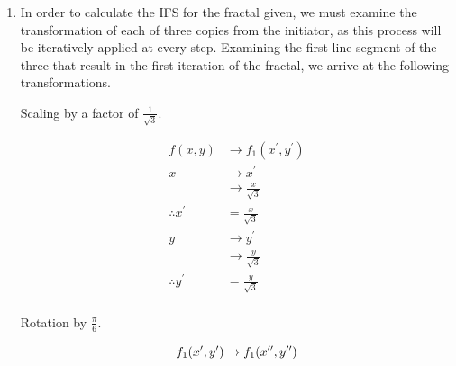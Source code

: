 \documentclass[a4paper]{article}
\begin{document}
\begin{enumerate}[label=\textbf{\arabic*.}]
\begin{enumerate}
		\item In order to calculate the IFS for the fractal given, we must examine the transformation of each of three copies from the initiator, as this process will be iteratively applied at every step. Examining the first line segment of the three that result in the first iteration of the fractal, we arrive at the following transformations.

		\bigbreak

		\begin{center}
		Scaling by a factor of $\frac{1}{\sqrt{3}}$.
		\end{center}

		\begin{align*}
		f(x,y) & \rightarrow f_1(x^{\prime},y^{\prime})\\
		x & \rightarrow x^{\prime}\\
		& \rightarrow \frac{x}{\sqrt{3}}\\
		\therefore x^{\prime} & = \frac{x}{\sqrt{3}}\\
		y & \rightarrow y^{\prime}\\
		& \rightarrow \frac{y}{\sqrt{3}}\\
		\therefore y^{\prime} & = \frac{y}{\sqrt{3}}\\
		\end{align*}

		\begin{center}
		Rotation by $\frac{\pi}{6}$.
		\end{center}

		\begin{equation*}
		f_1(x^{\prime},y^{\prime}) \rightarrow f_1(x^{\prime \prime},y^{\prime \prime})\\
		\end{equation*}


\end{enumerate}
\end{enumerate}
\end{document}
